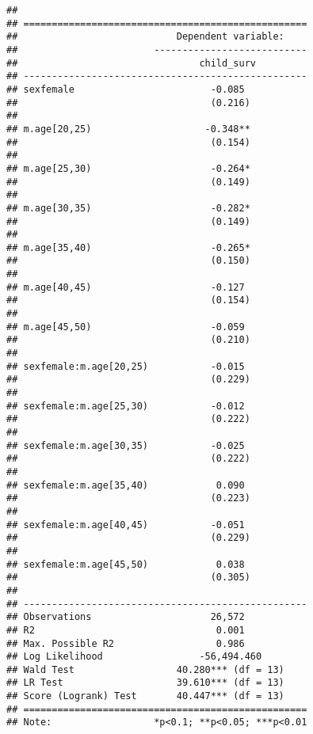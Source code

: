\documentclass[
]{article}
\begin{document}
\begin{verbatim}
## 
## ==================================================
##                            Dependent variable:    
##                        ---------------------------
##                                child_surv         
## --------------------------------------------------
## sexfemale                        -0.085           
##                                  (0.216)          
##                                                   
## m.age[20,25)                    -0.348**          
##                                  (0.154)          
##                                                   
## m.age[25,30)                     -0.264*          
##                                  (0.149)          
##                                                   
## m.age[30,35)                     -0.282*          
##                                  (0.149)          
##                                                   
## m.age[35,40)                     -0.265*          
##                                  (0.150)          
##                                                   
## m.age[40,45)                     -0.127           
##                                  (0.154)          
##                                                   
## m.age[45,50)                     -0.059           
##                                  (0.210)          
##                                                   
## sexfemale:m.age[20,25)           -0.015           
##                                  (0.229)          
##                                                   
## sexfemale:m.age[25,30)           -0.012           
##                                  (0.222)          
##                                                   
## sexfemale:m.age[30,35)           -0.025           
##                                  (0.222)          
##                                                   
## sexfemale:m.age[35,40)            0.090           
##                                  (0.223)          
##                                                   
## sexfemale:m.age[40,45)           -0.051           
##                                  (0.229)          
##                                                   
## sexfemale:m.age[45,50)            0.038           
##                                  (0.305)          
##                                                   
## --------------------------------------------------
## Observations                     26,572           
## R2                                0.001           
## Max. Possible R2                  0.986           
## Log Likelihood                 -56,494.460        
## Wald Test                  40.280*** (df = 13)    
## LR Test                    39.610*** (df = 13)    
## Score (Logrank) Test       40.447*** (df = 13)    
## ==================================================
## Note:                  *p<0.1; **p<0.05; ***p<0.01
\end{verbatim}
\end{document}
